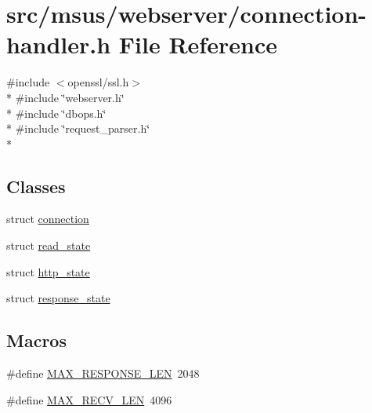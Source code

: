 \hypertarget{connection-handler_8h}{\section{src/msus/webserver/connection-\/handler.h File Reference}
\label{connection-handler_8h}
}
{\ttfamily \#include $<$openssl/ssl.\-h$>$}\\*
{\ttfamily \#include \char`\"{}webserver.\-h\char`\"{}}\\*
{\ttfamily \#include \char`\"{}dbops.\-h\char`\"{}}\\*
{\ttfamily \#include \char`\"{}request\-\_\-parser.\-h\char`\"{}}\\*
\subsection*{Classes}
\begin{DoxyCompactItemize}
\item 
struct \hyperlink{structconnection}{connection}
\item 
struct \hyperlink{structread__state}{read\-\_\-state}
\item 
struct \hyperlink{structhttp__state}{http\-\_\-state}
\item 
struct \hyperlink{structresponse__state}{response\-\_\-state}
\end{DoxyCompactItemize}
\subsection*{Macros}
\begin{DoxyCompactItemize}
\item 
\#define \hyperlink{connection-handler_8h_a9a83ff2f12aca569bc0f799a56e7a2c2}{M\-A\-X\-\_\-\-R\-E\-S\-P\-O\-N\-S\-E\-\_\-\-L\-E\-N}~2048
\item 
\#define \hyperlink{connection-handler_8h_a774d5c0d74bbc47fad33f175a0bd13f4}{M\-A\-X\-\_\-\-R\-E\-C\-V\-\_\-\-L\-E\-N}~4096
\end{DoxyCompactItemize}
